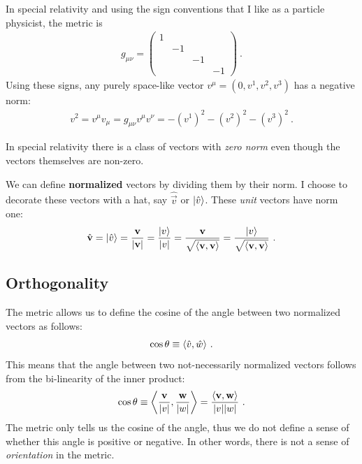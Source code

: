 \documentclass[12pt]{article}
\begin{document}
\begin{example}
In special relativity and using the sign conventions that I like as a particle physicist, the metric is
\begin{align}
    g_{\mu\nu} = 
    \begin{pmatrix}
        1 & & & \\
        & -1 & & \\
        & & -1 & \\
        & & & -1 
    \end{pmatrix} \ .
\end{align}
Using these signs, any purely space-like vector $v^\mu = (0,v^1, v^2, v^3)$ has a negative norm: 
\begin{align}
    v^2 = v^\mu v_\mu = g_{\mu\nu}v^\mu v^\nu = - (v^1)^2 - (v^2)^2 - (v^3)^2 \ .
\end{align}
\end{example}

\begin{exercise}
In special relativity there is a class of vectors with \emph{zero norm} even though the vectors themselves are non-zero. 
\end{exercise}


We can define \textbf{normalized} vectors by dividing them by their norm. I choose to decorate these vectors with a hat, say $\hat{\vec{v}}$ or $\left|\hat v\right\rangle$. These \emph{unit} vectors have norm one:
\begin{align}
    \hat{\mathbf{v}} = \left|\hat v\right\rangle = \frac{\mathbf{v}}{|\mathbf{v}|} 
    = \frac{\left|v\right\rangle}{|v|} 
    = \frac{\mathbf{v}}{\sqrt{\langle\mathbf{v},\mathbf{v}\rangle}} 
    =
    \frac{\left|v\right\rangle}{\sqrt{\langle\mathbf{v},\mathbf{v}\rangle}}  \ .
\end{align}



\subsection{Orthogonality}

The metric allows us to define the cosine of the angle between two normalized vectors as follows:
\begin{align}
    \cos \theta \equiv 
    {\langle\hat v, \hat w \rangle} \ .
\end{align}
This means that the angle between two not-necessarily normalized vectors follows from the bi-linearity of the inner product:
\begin{align}
    \cos \theta \equiv 
    {\left\langle\frac{\mathbf{v}}{|v|}, \frac{\mathbf{w}}{|w|} \right\rangle} 
    =
    \frac{\left\langle  \mathbf{v} ,  \mathbf{w}\right\rangle }
    {|v||w|}
    \ .
\end{align}
The metric only tells us the cosine of the angle, thus we do not define a sense of whether this angle is positive or negative. In other words, there is not a sense of \emph{orientation} in the metric. 
\end{document}
